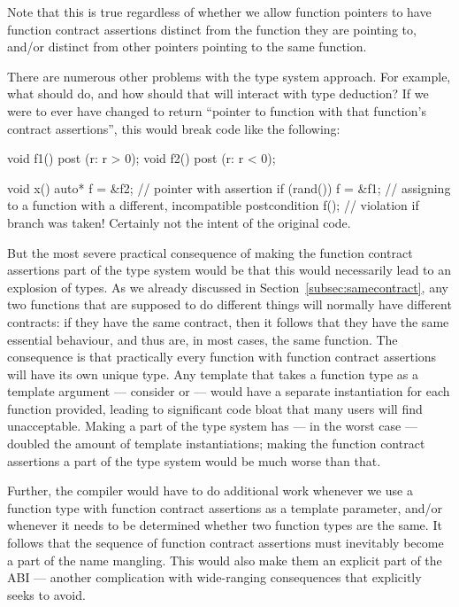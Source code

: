 Note that this is true regardless of whether we allow function pointers to have function contract assertions distinct from the function they are pointing to, and/or distinct from other pointers pointing to the same function.

There are numerous other problems with the type system approach. For example, what should  do, and how should that will interact with type deduction? If we were to ever have  changed to return ``pointer to function with that function's contract assertions'', this would break code like the following:
\begin{codeblock}
void f1() post (r: r > 0);
void f2() post (r: r < 0);

void x() {
  auto* f = &f2;   // pointer with assertion 
  if (rand()) {
    f = &f1;  // assigning to a function with a different, incompatible postcondition
  }
  f();  // violation if branch was taken! Certainly not the intent of the original code.
}
\end{codeblock}
But the most severe practical consequence of making the function contract assertions part of the type system would be that this would necessarily lead to an explosion of types. As we already discussed in Section~\ref{subsec:samecontract}, any two functions that are supposed to do different things will normally have different contracts: if they have the same contract, then it follows that they have the same essential behaviour, and thus are, in most cases, the same function. The consequence is that practically every function with function contract assertions will have its own unique type. Any template that takes a function type as a template argument --- consider  or  --- would have a separate instantiation for each function provided, leading to significant code bloat that many users will find unacceptable. Making  a part of the type system has --- in the worst case --- doubled the amount of template instantiations; making the function contract assertions a part of the type system would be much worse than that.

Further, the compiler would have to do additional work whenever we use a function type with function contract assertions as a template parameter, and/or whenever it needs to be determined whether two function types are the same. It follows that the sequence of function contract assertions must inevitably become a part of the name mangling. This would also make them an explicit part of the ABI --- another complication with wide-ranging consequences that \cite{P2900R7} explicitly seeks to avoid.

